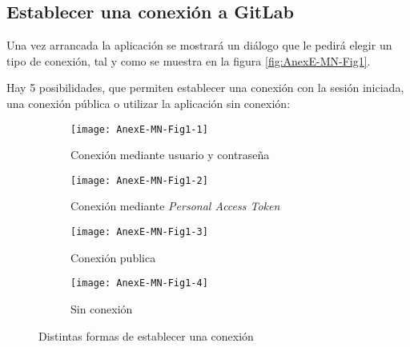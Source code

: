 \subsection{Establecer una conexión a GitLab}
Una vez arrancada la aplicación se mostrará un diálogo que le pedirá elegir un tipo de conexión, tal y como se muestra en la figura \ref{fig:AnexE-MN-Fig1}.


Hay 5 posibilidades, que permiten establecer una conexión con la sesión iniciada, una conexión pública o utilizar la aplicación sin conexión:
\begin{figure}[h]
	\centering
	\begin{subfigure}{.45\textwidth}
		\centering
		\texttt{[image: AnexE-MN-Fig1-1]}
		\caption{Conexión mediante usuario y contraseña}
		\label{fig:dialogo-conexion_contraseña}
	\end{subfigure}\hfill
	\begin{subfigure}{.45\textwidth}
		\centering
		\texttt{[image: AnexE-MN-Fig1-2]}
		\caption{Conexión mediante \textit{Personal Access Token}}
		\label{fig:dialogo-conexion_token}
	\end{subfigure}
	\begin{subfigure}{.45\textwidth}
		\centering
		\texttt{[image: AnexE-MN-Fig1-3]}
		\caption{Conexión publica}
		\label{fig:dialogo-conexion_publica}
	\end{subfigure}\hfill
	\begin{subfigure}{.45\textwidth}
		\centering
		\texttt{[image: AnexE-MN-Fig1-4]}
		\caption{Sin conexión}
		\label{fig:dialogo-conexion_sin-conexion}
	\end{subfigure}
	\caption{Distintas formas de establecer una conexión}
	\label{fig:AnexE-MN-Fig1-}
\end{figure}
